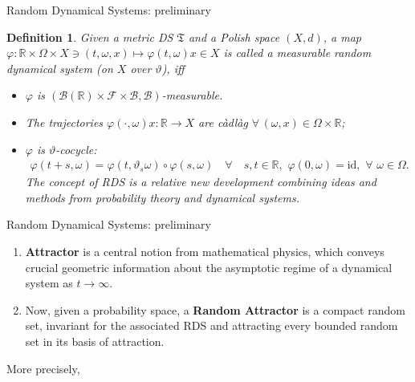 \documentclass[xcolor=dvipsnames,leqno]{beamer}
\newcommand{\R}{\mathbb{R}}
\newtheorem{defn}{Definition}
\begin{document}
\begin{frame}{Random Dynamical Systems: preliminary}
	\begin{defn}\label{defnrds}
    Given a metric DS $\mathfrak{T}$ and a Polish space $(X,d)$, a map $\varphi:\R\times\Omega\times X\ni (t,\omega,x)\mapsto\varphi(t,\omega)x\in X$ is called a \emph{measurable random dynamical system} (on $X$ over $\vartheta$), iff
\begin{itemize}
    \item $\varphi$ is $(\mathcal{B}(\R)\times\mathcal{F}\times\mathcal{B},\mathcal{B})$-measurable.
    \item The trajectories $\varphi(\cdot,\omega)x:\R\to X$ are c\`adl\`ag $\forall\,(\omega,x)\in\Omega\times\R$;
    \item $\varphi$ is $\vartheta$-cocycle:
\begin{align*}
    \varphi(t+s,\omega)=\varphi(t,\vartheta_s\omega)\circ\varphi(s,\omega)\quad\forall\quad s,t\in\R,\,\,\varphi(0,\omega)=\text{id},\,\,\forall\,\,\omega\in\Omega.
\end{align*}   
The concept of RDS is a relative new development combining ideas and methods from probability theory and dynamical systems.
\end{itemize}

\end{defn}
\end{frame}

\begin{frame}{Random Dynamical Systems: preliminary}
\begin{enumerate}
	\item  \textbf{Attractor} is a central notion from mathematical physics, which conveys crucial geometric information about the asymptotic regime of a dynamical system as $t\to \infty$.
	\item  Now, given a probability space, a \textbf{Random Attractor} is a compact random set, invariant for the associated RDS and attracting every bounded random set in its basis of attraction.
\end{enumerate}
 More precisely,

\end{frame}
\end{document}
